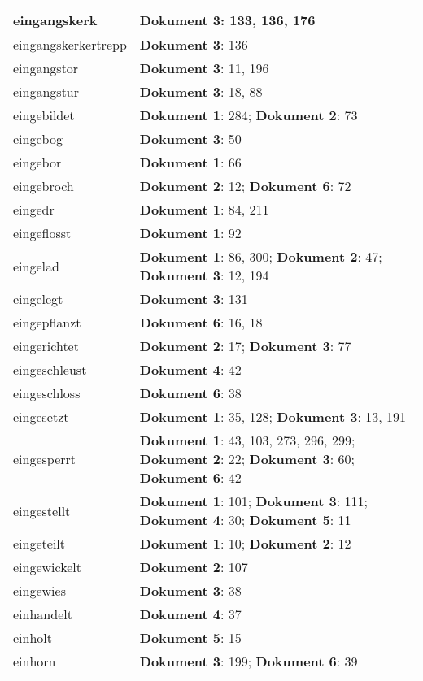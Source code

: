\documentclass[a5paper]{article}
\begin{document}
\begin{longtable}[l]{|l|p{3in}|}
\hline
eingangskerk & \textbf{Dokument 3}: 133, 136, 176 \\
\hline
eingangskerkertrepp & \textbf{Dokument 3}: 136 \\
\hline
eingangstor & \textbf{Dokument 3}: 11, 196 \\
\hline
eingangstur & \textbf{Dokument 3}: 18, 88 \\
\hline
eingebildet & \textbf{Dokument 1}: 284; \textbf{Dokument 2}: 73 \\
\hline
eingebog & \textbf{Dokument 3}: 50 \\
\hline
eingebor & \textbf{Dokument 1}: 66 \\
\hline
eingebroch & \textbf{Dokument 2}: 12; \textbf{Dokument 6}: 72 \\
\hline
eingedr & \textbf{Dokument 1}: 84, 211 \\
\hline
eingeflosst & \textbf{Dokument 1}: 92 \\
\hline
eingelad & \textbf{Dokument 1}: 86, 300; \textbf{Dokument 2}: 47; \textbf{Dokument 3}: 12, 194 \\
\hline
eingelegt & \textbf{Dokument 3}: 131 \\
\hline
eingepflanzt & \textbf{Dokument 6}: 16, 18 \\
\hline
eingerichtet & \textbf{Dokument 2}: 17; \textbf{Dokument 3}: 77 \\
\hline
eingeschleust & \textbf{Dokument 4}: 42 \\
\hline
eingeschloss & \textbf{Dokument 6}: 38 \\
\hline
eingesetzt & \textbf{Dokument 1}: 35, 128; \textbf{Dokument 3}: 13, 191 \\
\hline
eingesperrt & \textbf{Dokument 1}: 43, 103, 273, 296, 299; \textbf{Dokument 2}: 22; \textbf{Dokument 3}: 60; \textbf{Dokument 6}: 42 \\
\hline
eingestellt & \textbf{Dokument 1}: 101; \textbf{Dokument 3}: 111; \textbf{Dokument 4}: 30; \textbf{Dokument 5}: 11 \\
\hline
eingeteilt & \textbf{Dokument 1}: 10; \textbf{Dokument 2}: 12 \\
\hline
eingewickelt & \textbf{Dokument 2}: 107 \\
\hline
eingewies & \textbf{Dokument 3}: 38 \\
\hline
einhandelt & \textbf{Dokument 4}: 37 \\
\hline
einholt & \textbf{Dokument 5}: 15 \\
\hline
einhorn & \textbf{Dokument 3}: 199; \textbf{Dokument 6}: 39 \\

\end{longtable}
\end{document}
